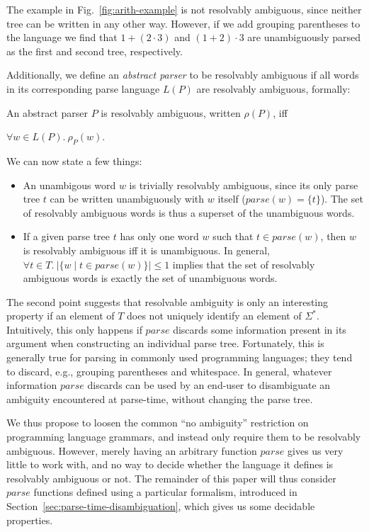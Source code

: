 \documentclass[acmsmall,review,anonymous]{acmart}\settopmatter{printfolios=true,printccs=false,printacmref=false}
\newcommand{\T}{\Sigma} %
\newcommand{\parse}{\mathit{parse}} %
\begin{document}
The example in Fig.~\ref{fig:arith-example} is not resolvably ambiguous, since neither tree can be written in any other way. However, if we add grouping parentheses to the language we find that $1 + (2 \cdot 3)$ and $(1 + 2) \cdot 3$ are unambiguously parsed as the first and second tree, respectively.

Additionally, we define an \emph{abstract parser} to be resolvably ambiguous if all words in its corresponding parse language $L(P)$ are resolvably ambiguous, formally:

\begin{definition}\label{def:resolvable-language}
  An abstract parser $P$ is resolvably ambiguous, written $\rho(P)$, iff

  $\forall w \in L(P).\ \rho_P(w)$.
\end{definition}

\noindent We can now state a few things:

\begin{itemize}
\item An unambigous word $w$ is trivially resolvably ambiguous, since its only parse tree $t$ can be written unambiguously with $w$ itself ($\parse(w) = \{t\}$). The set of resolvably ambiguous words is thus a superset of the unambiguous words.
\item If a given parse tree $t$ has only one word $w$ such that $t \in \parse(w)$, then $w$ is resolvably ambiguous iff it is unambiguous. In general, $\forall t \in T.\ \lvert\{w \mid t \in \parse(w)\}\rvert \leq 1$ implies that the set of resolvably ambiguous words is exactly the set of unambiguous words.
\end{itemize}

\noindent The second point suggests that resolvable ambiguity is only an interesting property if an element of $T$ does not uniquely identify an element of $\T^{*}$. Intuitively, this only happens if $\parse$ discards some information present in its argument when constructing an individual parse tree. Fortunately, this is generally true for parsing in commonly used programming languages; they tend to discard, e.g., grouping parentheses and whitespace. In general, whatever information $\parse$ discards can be used by an end-user to disambiguate an ambiguity encountered at parse-time, without changing the parse tree.

We thus propose to loosen the common ``no ambiguity'' restriction on programming language grammars, and instead only require them to be resolvably ambiguous. However, merely having an arbitrary function $\parse$ gives us very little to work with, and no way to decide whether the language it defines is resolvably ambiguous or not. The remainder of this paper will thus consider $\parse$ functions defined using a particular formalism, introduced in Section~\ref{sec:parse-time-disambiguation}, which gives us some decidable properties.
\end{document}
